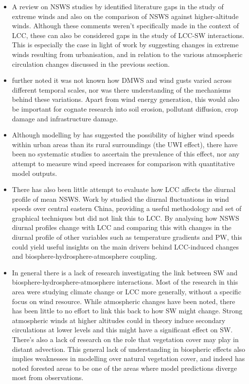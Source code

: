 \begin{itemize}
	\item A review on \ac{NSWS} studies by \citet{wu2018} identified literature gaps in the study of extreme winds and also on the comparison of \ac{NSWS} against higher-altitude winds. Although these comments weren’t specifically made in the context of \ac{LCC}, these can also be considered gaps in the study of \ac{LCC}-\ac{SW} interactions. This is especially the case in light of work by \citet{gero2006, zhang2020, zhang2022} suggesting changes in extreme winds resulting from urbanisation, and in relation to the various atmospheric circulation changes discussed in the previous section.
	\item \citet{zha2021} further noted it was not known how \ac{DMWS} and wind gusts varied across different temporal scales, nor was there understanding of the mechanisms behind these variations. Apart from wind energy generation, this would also be important for cognate research into soil erosion, pollutant diffusion, crop damage and infrastructure damage.
	\item Although modelling by \citet{droste2018} has suggested the possibility of higher wind speeds within urban areas than its rural surroundings (the \ac{UWI} effect), there have been no systematic studies to ascertain the prevalence of this effect, nor any attempt to measure wind speed increases for comparison with quantitative model outputs.
	\item There has also been little attempt to evaluate how \ac{LCC} affects the diurnal profile of mean \ac{NSWS}. Work by \citet{yu2009} studied the diurnal fluctuations in wind speeds over central eastern China, providing a useful methodology and set of graphical techniques but did not link this to \ac{LCC}. By analysing how \ac{NSWS} diurnal profiles change with \ac{LCC} and comparing this with changes in the diurnal profile of other variables such as temperature gradients and \ac{PW}, this could yield useful insights on the main drivers behind \ac{LCC}-induced changes and biosphere-hydrosphere-atmosphere coupling.
	\item In general there is a lack of research investigating the link between \ac{SW} and biosphere-hydrosphere-atmosphere interactions. Most of the research in this area were studying climate change or \ac{LCC} more generally, without a specific focus on wind resource. While atmospheric changes have been noted, there has been little to no effort to link this back to how \ac{SW} might change. Strong atmospheric winds at higher altitudes could in theory induce secondary circulations at lower levels and this might have a significant effect on \ac{SW}. There’s also a lack of research on the role that vegetation cover may play in distant advection. This general lack of understanding in biospheric effects also implies weaknesses in modelling over natural vegetation cover, and indeed \citet{eea2009} has noted forested areas to be one of the areas where model predictions diverge most from observations.

\end{itemize}
